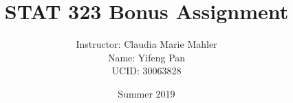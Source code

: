 \documentclass[10pt, letterpaper, titlepage]{article}
\title{STAT 323 Bonus Assignment}
\author{Instructor: Claudia Marie Mahler
    \\Name: Yifeng Pan
    \\UCID: 30063828}
\date{Summer 2019}
\begin{document}
    \maketitle

    
    
    \newpage
    \begin{figure}[h]
        \centering
        
        \caption{}
        \label{fig:1h}
    \end{figure}
    \begin{figure}[h]
        \centering
        
        \caption{}
        \label{fig:2g}
    \end{figure}

    \newpage
    

    \newpage
    
\end{document}
